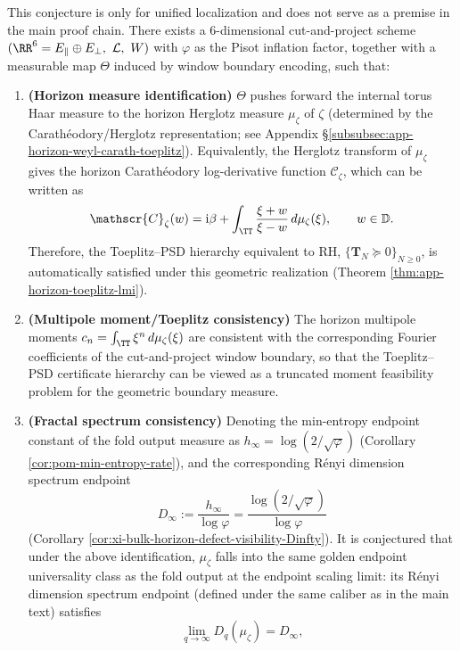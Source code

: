 \begin{conjecture}\label{conj:discussion-horizon-measure-cutproject}
This conjecture is only for unified localization and does not serve as a premise in the main proof chain.
There exists a \(6\)-dimensional cut-and-project scheme \((\RR^6=E_{\parallel}\oplus E_{\perp},\ \mathcal{L},\ W)\) with \(\varphi\) as the Pisot inflation factor, together with a measurable map \(\Theta\) induced by window boundary encoding, such that:
\begin{enumerate}
  \item \textbf{(Horizon measure identification)}
  \(\Theta\) pushes forward the internal torus Haar measure to the horizon Herglotz measure \(\mu_\zeta\) of \(\zeta\) (determined by the Carath\'eodory/Herglotz representation; see Appendix \S\ref{subsubsec:app-horizon-weyl-carath-toeplitz}).
  Equivalently, the Herglotz transform of \(\mu_\zeta\) gives the horizon Carath\'eodory log-derivative function \(\mathscr{C}_\zeta\), which can be written as
  \[
    \mathscr{C}_\zeta(w)=\mathrm{i}\beta+\int_{\TT}\frac{\xi+w}{\xi-w}\,d\mu_\zeta(\xi),
    \qquad w\in\mathbb{D}.
  \]
  Therefore, the Toeplitz--PSD hierarchy equivalent to RH,
  \(\{\mathbf{T}_N\succeq 0\}_{N\ge 0}\), is automatically satisfied under this geometric realization (Theorem \ref{thm:app-horizon-toeplitz-lmi}).
  \item \textbf{(Multipole moment/Toeplitz consistency)}
  The horizon multipole moments \(c_n=\int_{\TT}\xi^n\,d\mu_\zeta(\xi)\) are consistent with the corresponding Fourier coefficients of the cut-and-project window boundary, so that the Toeplitz--PSD certificate hierarchy can be viewed as a truncated moment feasibility problem for the geometric boundary measure.
  \item \textbf{(Fractal spectrum consistency)}
  Denoting the min-entropy endpoint constant of the fold output measure as \(h_\infty=\log(2/\sqrt\varphi)\) (Corollary \ref{cor:pom-min-entropy-rate}), and the corresponding R\'enyi dimension spectrum endpoint
  \[
    D_\infty:=\frac{h_\infty}{\log\varphi}=\frac{\log(2/\sqrt\varphi)}{\log\varphi}
  \]
  (Corollary \ref{cor:xi-bulk-horizon-defect-visibility-Dinfty}).
  It is conjectured that under the above identification, \(\mu_\zeta\) falls into the same golden endpoint universality class as the fold output at the endpoint scaling limit: its R\'enyi dimension spectrum endpoint (defined under the same caliber as in the main text) satisfies
  \[
    \lim_{q\to\infty}D_q(\mu_\zeta)=D_\infty,
\]
\end{enumerate}
\end{conjecture}
